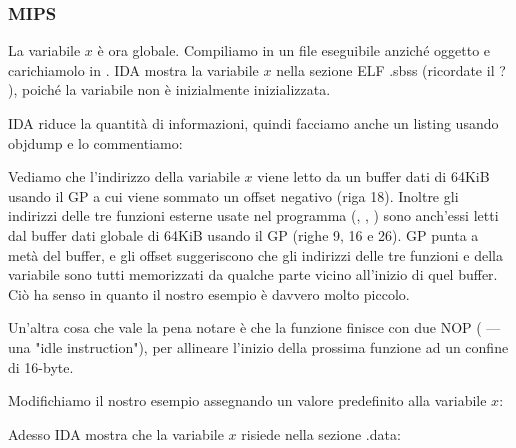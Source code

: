 \subsubsection{MIPS}


La variabile $x$ è ora globale.
Compiliamo in un file eseguibile anziché oggetto e carichiamolo in \IDA.
IDA mostra la variabile $x$ nella sezione ELF .sbss (ricordate il ? ),
poiché la variabile non è inizialmente inizializzata.



IDA riduce la quantità di informazioni, quindi facciamo anche un listing usando objdump e lo commentiamo:



Vediamo che l'indirizzo della variabile $x$ viene letto da un buffer dati di 64KiB usando il GP a cui viene sommato un offset negativo (riga 18).
Inoltre gli indirizzi delle tre funzioni esterne usate nel programma (\puts, \scanf, \printf) sono anch'essi letti dal buffer dati globale di 64KiB usando il GP (righe 9, 16 e 26).
GP punta a metà del buffer, e gli offset suggeriscono che gli indirizzi delle tre funzioni e della variabile sono tutti memorizzati da qualche parte vicino all'inizio di quel buffer.
Ciò ha senso in quanto il nostro esempio è davvero molto piccolo.


Un'altra cosa che vale la pena notare è che la funzione finisce con due \ac{NOP} ( --- una "idle instruction"), per allineare l'inizio della prossima funzione ad un confine di 16-byte.


Modifichiamo il nostro esempio assegnando un valore predefinito alla variabile $x$:



Adesso IDA mostra che la variabile $x$ risiede nella sezione .data:



